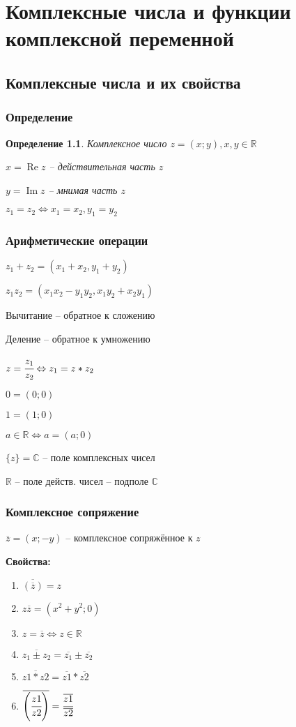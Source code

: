 \documentclass[final]{report}
\newcommand{\R}{\mathbb{R}}
\renewcommand{\C}{\mathbb{C}}
\newcommand{\LRA}{\Leftrightarrow}
\renewcommand{\bar}{\overline}
\renewcommand{\Im}{\mathop{\mathrm{Im}}\nolimits}
\renewcommand{\Re}{\mathop{\mathrm{Re}}\nolimits}
\newcommand{\opr}[1]{\begin{opred}#1\end{opred}}
\newtheorem*{opred}{Определение}
\theoremstyle{remark}
\begin{document}
\tableofcontents
\chapter{Комплексные числа и функции комплексной переменной}
\section{Комплексные числа и их свойства}
\subsection{Определение}
\opr{Комплексное число $z=(x;y), x,y\in\R$

$x=\Re z$ -- действительная часть $z$

$y=\Im z$ -- мнимая часть $z$}

$z_1=z_2 \LRA x_1=x_2, y_1=y_2$

\subsection{Арифметические операции}
$z_1+z_2=(x_1+x_2,y_1+y_2)$

$z_1z_2=(x_1x_2-y_1y_2,x_1y_2+x_2y_1)$

Вычитание -- обратное к сложению

Деление -- обратное к умножению

$z=\cfrac{z_1}{z_2} \LRA z_1=z*z_2$

$0=(0;0)$

$1=(1;0)$

$a\in\R\LRA a=(a;0)$

$\{z\}=\C$ -- поле комплексных чисел

$\R$ -- поле действ. чисел -- подполе $\C$

\subsection{Комплексное сопряжение}
$\bar{z}=(x;-y)$ -- комплексное сопряжённое к $z$

{\bfseries Свойства:}
\begin{enumerate}
\item$\bar{\left(\bar{z}\right)}=z$
\item$z\bar{z}=(x^2+y^2;0)$
\item$z=\bar{z}\LRA z\in\R$
\item$\bar{z_1\pm z_2}=\bar{z_1}\pm\bar{z_2}$
\item$\bar{z1*z2}=\bar{z1}*\bar{z2}$
\item$\bar{\left(\cfrac{z1}{z2}\right)}=\cfrac{\bar{z1}}{\bar{z2}}$
\end{enumerate}
\end{document}
